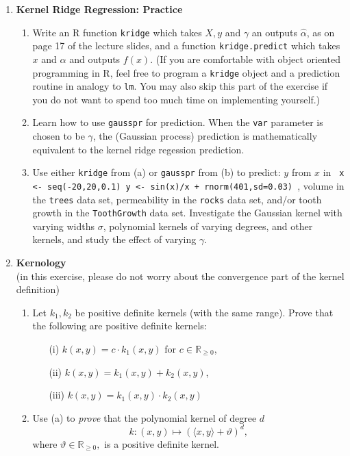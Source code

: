 \documentclass[a4paper,10pt,oneside]{article}
\begin{document}
\begin{enumerate}
\item {\bf Kernel Ridge Regression: Practice}
\begin{enumerate}
\item Write an R function \texttt{kridge} which takes $X, y$ and $\gamma$ an outputs $\widehat{\alpha}$, as on page 17 of the lecture slides, and a function \texttt{kridge.predict} which takes $x$ and $\widehat{\alpha}$ and outputs $f(x)$. (If you are comfortable with object oriented programming in R, feel free to program a \texttt{kridge} object and a prediction routine in analogy to \texttt{lm}. You may also skip this part of the exercise if you do not want to spend too much time on implementing yourself.)
\item Learn how to use \texttt{gausspr} for prediction. When the \texttt{var} parameter is chosen to be $\gamma$, the (Gaussian process) prediction is mathematically equivalent to the kernel ridge regession prediction.
\item Use either \texttt{kridge} from (a) or \texttt{gausspr} from (b) to predict: $y$ from $x$ in
 \texttt{
 x <- seq(-20,20,0.1)
 y <- sin(x)/x + rnorm(401,sd=0.03) },
  volume in the \texttt{trees} data set, permeability in the \texttt{rocks} data set, and/or tooth growth in the \texttt{ToothGrowth} data set. Investigate the Gaussian kernel with varying widths $\sigma$, polynomial kernels of varying degrees, and other kernels, and study the effect of varying $\gamma$.
\end{enumerate}


\item {\bf Kernology}\\
(in this exercise, please do not worry about the convergence part of the kernel definition)
\begin{enumerate}
\item Let $k_1,k_2$ be positive definite kernels (with the same range). Prove that the following are positive definite kernels:
  \begin{enumerate}
  \item[(i)] $k(x,y) = c \cdot k_1(x,y)$ for $c\in\mathbb{R}_{\ge 0}$,
  \item[(ii)] $k(x,y) = k_1(x,y) + k_2(x,y)$,
  \item[(iii)] $k(x,y) = k_1(x,y) \cdot k_2(x,y)$
  \end{enumerate}

\item Use (a) to {\it prove} that the polynomial kernel of degree $d$
       $$ k: (x,y) \mapsto (\langle x, y\rangle + \vartheta )^d,$$
where $\vartheta\in\mathbb{R}_{\ge 0},$ is a positive definite kernel.


\end{enumerate}
\end{enumerate}
\end{document}

